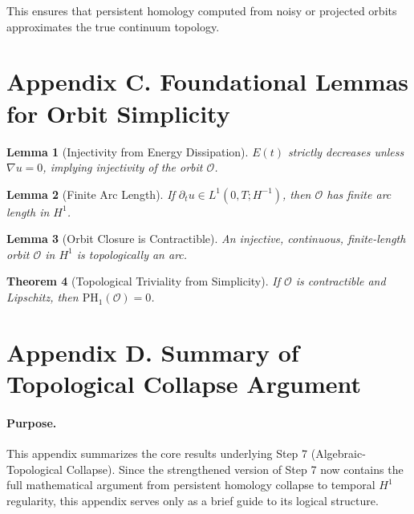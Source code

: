 \documentclass[11pt]{article}
\newtheorem{theorem}{Theorem}[section]
\newtheorem{lemma}[theorem]{Lemma}
\theoremstyle{definition}
\begin{document}
This ensures that persistent homology computed from noisy or projected orbits approximates the true continuum topology.


\section*{Appendix C. Foundational Lemmas for Orbit Simplicity}
\label{sec:appendixC}

\begin{lemma}[Injectivity from Energy Dissipation]
$E(t)$ strictly decreases unless $\nabla u = 0$, implying injectivity of the orbit $\mathcal{O}$.
\end{lemma}

\begin{lemma}[Finite Arc Length]
If $\partial_t u \in L^1(0, T; H^{-1})$, then $\mathcal{O}$ has finite arc length in $H^1$.
\end{lemma}

\begin{lemma}[Orbit Closure is Contractible]
An injective, continuous, finite-length orbit $\mathcal{O}$ in $H^1$ is topologically an arc.
\end{lemma}

\begin{theorem}[Topological Triviality from Simplicity]
If $\mathcal{O}$ is contractible and Lipschitz, then $\mathrm{PH}_1(\mathcal{O}) = 0$.
\end{theorem}


\section*{Appendix D. Summary of Topological Collapse Argument}

\paragraph{Purpose.}
This appendix summarizes the core results underlying Step 7 (Algebraic-Topological Collapse). Since the strengthened version of Step 7 now contains the full mathematical argument from persistent homology collapse to temporal $H^1$ regularity, this appendix serves only as a brief guide to its logical structure.
\end{document}
